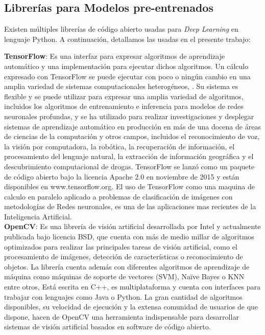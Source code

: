 \subsection{Librerías para Modelos pre-entrenados} 
Existen múltiples librerías de código abierto usadas para \textit{Deep Learning} en lenguaje Python. A continuación, detallamos las usadas en el presente trabajo: 

\Item \textbf{TensorFlow}: Es una interfaz para expresar algoritmos de aprendizaje automático y una implementación para ejecutar dichos algoritmos. Un cálculo expresado con TensorFlow se puede ejecutar con poco o ningún cambio en una amplia variedad de sistemas computacionales heterogéneos, \cite{tensorflow2015-whitepaper}. Su sistema es flexible y se puede utilizar para expresar una amplia variedad de algoritmos, incluidos los algoritmos de entrenamiento e inferencia para modelos de redes neuronales profundas, y se ha utilizado para realizar investigaciones y desplegar sistemas de aprendizaje automático en producción en más de una docena de áreas de ciencias de la computación y otros campos, incluidos el reconocimiento de voz, la visión por computadora, la robótica, la recuperación de información, el procesamiento del lenguaje natural, la extracción de información geográfica y el descubrimiento computacional de drogas. TensorFlow se lanzó como un paquete de código abierto bajo la licencia Apache 2.0 en noviembre de 2015 y están disponibles en www.tensorflow.org. El uso de TensorFlow como una maquina de calculo en paralelo aplicado a problemas de clasificación de imágenes con metodologías de Redes neuronales, es una de las aplicaciones mas recientes de la Inteligencia Artificial.\\

\Item \textbf{OpenCV}\label{opencv}: Es una librería de visión artificial desarrollada por Intel y actualmente publicada bajo licencia BSD, que cuenta con más de medio millar de algoritmos optimizados para realizar las principales tareas de visión artificial, como el procesamiento de imágenes, detección de características o reconocimiento de objetos. La librería cuenta además con diferentes algoritmos de aprendizaje de máquina como máquinas de soporte de vectores (SVM), Naïve Bayes o KNN entre otros, \cite{opencv_library}
Está escrita en C++, es multiplataforma y cuenta con interfaces para trabajar con lenguajes como Java o Python. La gran cantidad de algoritmos disponibles, su velocidad de ejecución y la extensa comunidad de usuarios de que dispone, hacen de OpenCV una herramienta indispensable para desarrollar sistemas de visión artificial basados en software de código abierto.

